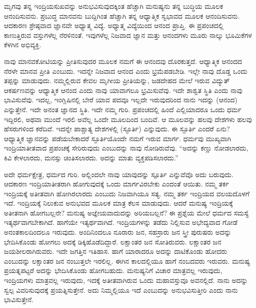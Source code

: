 ಮೃಗವು ತನ್ನ ಇಂದ್ರಿಯಸುಖವನ್ನು ಅನುಭವಿಸುವುದಕ್ಕಿಂತ ಹೆಚ್ಚಾಗಿ ಮನುಷ್ಯನು ತನ್ನ ಬುದ್ಧಿಯ ಮೂಲಕ ಆನಂದಿಸುವನು. ಪ್ರಬುದ್ಧ ಮಾನವನು ಬುದ್ದಿಗಿಂತ ಹೆಚ್ಚಾಗಿ ತನ್ನ ಆಧ್ಯಾತ್ಮಿಕ ಸ್ವಭಾವದ ಮೂಲಕ ಆನಂದಿಸುವನು. ಆದಕಾರಣ ಶ್ರೇಷ್ಠವಾದ ಜ್ಞಾನವೇ ಅಧ್ಯಾತ್ಮ ವಿದ್ಯೆ. ಅಧ್ಯಾತ್ಮ ವಿದ್ಯೆಯಿಂದ ಆನಂದ ಪ್ರಾಪ್ತಿ. ಈ ಪ್ರಪಂಚದಲ್ಲಿ ಕಾಣುತ್ತಿರುವ ವಸ್ತುಗಳೆಲ್ಲ ನೆರಳಿನಂತೆ. ಇವುಗಳೆಲ್ಲ ನಿಜವಾದ ಜ್ಞಾನ ಮತ್ತು ಆನಂದಗಳು ಮೂರು ನಾಲ್ಕು ಭೂಮಿಕೆಗಳ ಕೆಳಗಿನ ಅಭಿವ್ಯಕ್ತಿ.

ನಾವು ಮಾನವಕೋಟಿಯನ್ನು ಪ್ರೀತಿಸುವುದರ ಮೂಲಕ ನಮಗೆ ಈ ಆನಂದವು ದೊರಕುತ್ತದೆ. ಆಧ್ಯಾತ್ಮಿಕ ಆನಂದದ ನೆರಳೇ ಮಾನವ ಪ್ರೀತಿ ಎಂಬುದು. ಇದನ್ನೇ ನಿಜವಾದ ಆನಂದ ಎಂದು ಭ್ರಮೆಪಡಬೇಡಿ. ಇಲ್ಲೇ ನಾವು ದೊಡ್ಡ ಒಂದು ತಪ್ಪನ್ನು ಮಾಡುವುದು. ನಮ್ಮಲ್ಲಿರುವ ಕೇವಲ ಮೃಗೀಯ ಪ್ರೀತಿಯನ್ನು, ಜಡದೇಹದ ಮೇಲೆ ಇರುವ ವಿದ್ಯುತ್ ಆಕರ್ಷಣವನ್ನು ಆಧ್ಯಾತ್ಮಿಕ ಆನಂದ ಎಂದು ನಾವು ಯಾವಾಗಲೂ ಭ್ರಮಿಸುವೆವು. ಇದೇ ಶಾಶ್ವತ ಸ್ಥಿತಿ ಎಂದು ನಾವು ಭಾವಿಸುವೆವು. ಇದಲ್ಲ, ಇಂಗ್ಲಿಷಿನಲ್ಲಿ ಬೇರೆ ಯಾವ ಪದವೂ ಇಲ್ಲದೇ ಇರುವುದರಿಂದ ನಾನು ಇದನ್ನು  (ಆನಂದ) ಎನ್ನುತ್ತೇನೆ. ಇದೇ ಅನಂತ ಜ್ಞಾನದ ಸ್ಥಿತಿ. ಇದೇ ನಮ್ಮ ಗುರಿ. ಪ್ರಪಂಚದಲ್ಲಿ ಹಿಂದೆ ಎಲ್ಲಿಯಾದರೂ ಒಂದು ಧರ್ಮ ಇದ್ದಿರಲಿ, ಅಥವಾ ಮುಂದೆ ಇರಲಿ ಅವೆಲ್ಲ ಒಂದೇ ಮೂಲದಿಂದ ಬಂದಿವೆ. ಆ ಮೂಲವನ್ನು ಹಲವು ದೇಶಗಳು ಹಲವು ಹೆಸರುಗಳಿಂದ ಕರೆದಿವೆ. ಇದನ್ನೇ ಪಾಶ್ಚಾತ್ಯ ದೇಶಗಳಲ್ಲಿ  (ಸ್ಫೂರ್ತಿ) ಎನ್ನುವುದು. ಈ ಸ್ಫೂರ್ತಿ ಎಂದರೆ ಏನು? ಆಧ್ಯಾತ್ಮಿಕ ಜ್ಞಾನವನ್ನು ಪಡೆಯಬೇಕಾದರೆ ಸ್ಫೂರ್ತಿಯೊಂದೇ ನಮಗೆ ಇರುವ ಮಾರ್ಗ. ಧರ್ಮವು ಮುಖ್ಯವಾಗಿ ಇಂದ್ರಿಯಾತೀತವಾದ ಪ್ರಪಂಚಕ್ಕೆ ಸೇರಿರುವುದು ಎಂಬುದನ್ನು ನಾವು ನೋಡಿರುವೆವು. “ಅದನ್ನು ಕಣ್ಣು ನೋಡಲಾರದು, ಕಿವಿ ಕೇಳಲಾರದು, ಮನಸ್ಸು ಚಿಂತಿಸಲಾರದು. ಅದನ್ನು ಮಾತು ವ್ಯಕ್ತಪಡಿಸಲಾರದು.”

ಅದೇ ಧರ್ಮಕ್ಷೇತ್ರ, ಧರ್ಮದ ಗುರಿ. ಅಲ್ಲಿಂದಲೇ ನಾವು ಯಾವುದನ್ನು ಸ್ಪೂರ್ತಿ ಎನ್ನುವೆವೊ ಅದು ಬರುವುದು. ಆದಕಾರಣ ಇಂದ್ರಿಯಾತೀತರಾಗಿ ಹೋಗುವುದಕ್ಕೆ ಒಂದು ಮಾರ್ಗವಿರಬೇಕು ಎಂದಂತೆ ಆಯಿತು. ನಮ್ಮ ತರ್ಕ ಇಂದ್ರಿಯಕ್ಕೆ ಅತೀತವಾಗಿ ಹೋಗಿರಲಾರದು ಎಂಬುದು ನಿಜವಾಗಿಯೂ ಸತ್ಯ. ನಮ್ಮ ತರ್ಕ ಇಂದ್ರಿಯದ ವಲಯದೊಳಗೆ ಇದೆ. ಇಂದ್ರಿಯಕ್ಕೆ ನಿಲುಕುವ ಅನುಭವದ ಮೂಲಕ ಮಾತ್ರ ಕೆಲಸ ಮಾಡುವುದು. ಆದರೆ ಮನುಷ್ಯ ಇಂದ್ರಿಯಕ್ಕೆ ಅತೀತನಾಗಿ ಹೋಗಬಲ್ಲನೇ? ಮನುಷ್ಯ ಅಜ್ಞೇಯವಾದುದನ್ನು ಅರಿಯಬಲ್ಲನೆ? ಈ ಪ್ರಶ್ನೆಯ ಮೇಲೆ ಧರ್ಮದ ಸಮಸ್ಯೆ ಇತ್ಯರ್ಥವಾಗಬೇಕಾಗಿದೆ. ಹಾಗೆಯೇ ಇತ್ಯರ್ಥವಾಗಿದೆ. ಇಂದ್ರಿಯಗಳನ್ನು ತಡೆದು ನಿಲ್ಲಿಸುವ ಅಭೇದ್ಯವಾದ ಗೋಡೆ ಅನಂತಕಾಲದಿಂದಲೂ ಇರುವುದು. ಅಂದಿನಿಂದಲೂ ನೂರಾರು ಜನ, ಸಹಸ್ರಾರು ಜನ ಸ್ತ್ರೀ ಪುರುಷರು ಅದನ್ನು ಭೇದಿಸಿಕೊಂಡು ಹೋಗಲು ಅದಕ್ಕೆ ಡಿಕ್ಕಿ\break ಹೊಡೆದಿದ್ದಾರೆ. ಲಕ್ಷಾಂತರ ಜನ ಸೋತಿರುವರು. ಲಕ್ಷಾಂತರ ಜನ ಜಯಶೀಲರಾಗಿರುವರು. ಇದೇ ಜಗತ್ತಿನ ಇತಿಹಾಸ. ಹಾಗೆ ಯಾರಾದರೂ ಅದನ್ನು ದಾಟಿಕೊಂಡು ಹೋದರು ಎಂಬುದನ್ನು ಲಕ್ಷಾಂತರ ಜನ ನಂಬುತ್ತಲೇ ಇರಲಿಲ್ಲ. ಈಗಿನ ಕಾಲದಲ್ಲಿಯೂ ಹಾಗೆ ನಂಬದವರು ಇರುವರು. ಮನುಷ್ಯ ಪ್ರಯತ್ನಪಟ್ಟರೆ ಅದನ್ನು ಭೇದಿಸಿಕೊಂಡು ಹೋಗಬಹುದು. ಮನುಷ್ಯನಿಗೆ ವಿಚಾರ ಮಾತ್ರವಲ್ಲ ಇರುವುದು, ಇಂದ್ರಿಯಗಳು ಮಾತ್ರವಲ್ಲ ಇರುವುದು, ಇದಕ್ಕೆ ಅತೀತವಾಗಿರುವ ಒಂದು ಮಹಾವಸ್ತುವೂ ಅವನಲ್ಲಿದೆ. ನಾನು ಅದನ್ನು ಸ್ವಲ್ಪ ವಿವರಿಸುವುದಕ್ಕೆ ಪ್ರಯತ್ನಿಸುತ್ತೇನೆ. ಅದು ನಿಮ್ಮಲ್ಲಿಯೂ ಇದೆ ಎಂಬುದನ್ನು ಅನುಭವಿಸುತ್ತೀರಿ ಎಂದು ನಾನು ಭಾವಿಸುತ್ತೇನೆ.

